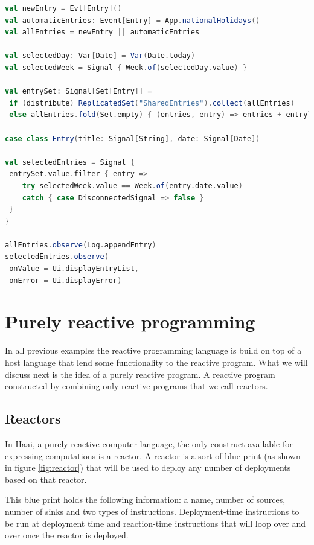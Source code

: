 \documentclass[a4paper]{book}
\begin{document}
\newpage

\begin{lstlisting}[language=Scala, caption={REScala, shared calendar application, (\cite{DBLP:conf/ecoop/MogkBSFM18})},captionpos=b, label={code:distrescala}, basicstyle=\small\ttfamily, frame=single]
val newEntry = Evt[Entry]()
val automaticEntries: Event[Entry] = App.nationalHolidays() 
val allEntries = newEntry || automaticEntries 

val selectedDay: Var[Date] = Var(Date.today) 
val selectedWeek = Signal { Week.of(selectedDay.value) } 

val entrySet: Signal[Set[Entry]] = 
 if (distribute) ReplicatedSet("SharedEntries").collect(allEntries)
 else allEntries.fold(Set.empty) { (entries, entry) => entries + entry}

case class Entry(title: Signal[String], date: Signal[Date]) 

val selectedEntries = Signal {
 entrySet.value.filter { entry => 
 	try selectedWeek.value == Week.of(entry.date.value)
 	catch { case DisconnectedSignal => false } 
 } 
} 

allEntries.observe(Log.appendEntry)
selectedEntries.observe(
 onValue = Ui.displayEntryList, 
 onError = Ui.displayError)
\end{lstlisting}


\section{Purely reactive programming} \label{sec:prp}
In all previous examples the reactive programming language is build on top of a host language that lend some functionality to the reactive program. What we will discuss next is the idea of a purely reactive program. A reactive program constructed by combining only reactive programs that we call reactors.
\subsection{Reactors}
In Haai, a purely reactive computer language, the only construct available for expressing computations is a reactor. A reactor is a sort of blue print (as shown in figure \ref{fig:reactor}) that will be used to deploy any number of deployments based on that reactor. 

This blue print holds the following information: a name, number of sources, number of sinks and two types of instructions. Deployment-time instructions to be run at deployment time and reaction-time instructions that will loop over and over once the reactor is deployed. 
\end{document}
